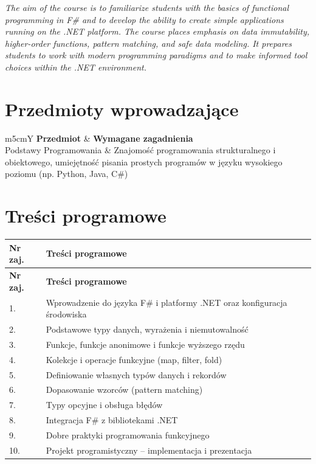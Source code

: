 \documentclass[12pt, a4paper]{article}
\newcommand{\thdrule}{\noalign{\global\setlength{\extrarowheight}{0pt}}}
\newcommand{\thdend}{\noalign{\global\setlength{\extrarowheight}{3pt}}}
\begin{document}
\textit{The aim of the course is to familiarize students with the basics of functional programming in F\# and to develop the ability to create simple applications running on the .NET platform. The course places emphasis on data immutability, higher-order functions, pattern matching, and safe data modeling. It prepares students to work with modern programming paradigms and to make informed tool choices within the .NET environment.}


\section{Przedmioty wprowadzające}

{\scriptsize
\begin{tabularx}{\textwidth}{m{5cm}Y}
\thdrule\toprule
{} {\color{white}\textbf{Przedmiot}} & {\color{white}\textbf{Wymagane zagadnienia}} \\
\midrule\thdend
   Podstawy Programowania & Znajomość programowania strukturalnego i obiektowego, umiejętność pisania prostych programów w języku wysokiego poziomu (np. Python, Java, C\#) \\
\bottomrule
\end{tabularx}}

\section{Treści programowe}

{\scriptsize
\begin{longtable}{m{1.5cm}m{14.5cm}}
\thdrule\toprule
\rowcolor{pjatkRed} {\color{white}\textbf{Nr zaj.}} & {\color{white}\textbf{Treści programowe}} \\
\midrule\thdend
\endfirsthead
\thdrule\toprule
\rowcolor{pjatkRed} {\color{white}\textbf{Nr zaj.}} & {\color{white}\textbf{Treści programowe}} \\
\midrule\thdend
\endhead
  \rowcolor{tableRowLight} 1. & Wprowadzenie do języka F\# i platformy .NET oraz konfiguracja środowiska \\
  \rowcolor{tableRowAlt} 2. & Podstawowe typy danych, wyrażenia i niemutowalność \\
  \rowcolor{tableRowLight} 3. & Funkcje, funkcje anonimowe i funkcje wyższego rzędu \\
  \rowcolor{tableRowAlt} 4. & Kolekcje i operacje funkcyjne (map, filter, fold) \\
  \rowcolor{tableRowLight} 5. & Definiowanie własnych typów danych i rekordów \\
  \rowcolor{tableRowAlt} 6. & Dopasowanie wzorców (pattern matching) \\
  \rowcolor{tableRowLight} 7. & Typy opcyjne i obsługa błędów \\
  \rowcolor{tableRowAlt} 8. & Integracja F\# z bibliotekami .NET \\
  \rowcolor{tableRowLight} 9. & Dobre praktyki programowania funkcyjnego \\
  \rowcolor{tableRowAlt} 10. & Projekt programistyczny – implementacja i prezentacja \\
\bottomrule
\end{longtable}}
\end{document}
